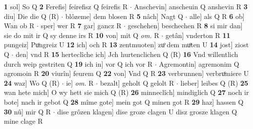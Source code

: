\documentclass[8pt,a4paper,notitlepage]{article}
\begin{document}
\begin{table}[ht]
\begin{minipage}[t]{0.5\linewidth}
\textbf{1} sol] So Q \textbf{2} Ferefis] feirefisz Q feirefis R  $\cdot$ Anschevin] anscheuin Q anshevin R \textbf{3} diu] Die die Q (R)  $\cdot$ blôzeme] dem blosen R \textbf{5} nâch] Nagt Q  $\cdot$ alle] als Q R \textbf{6} ob] Wan ob R  $\cdot$ sper] wer R \textbf{7} gar] gancz R  $\cdot$ geschehen] beschechen R \textbf{8} si mir dan] sie do mit ir Q sy denne irs R \textbf{10} von] mit Q \textit{om.} R  $\cdot$ getân] vnderton R \textbf{11} pungeiz] Puͦngreiz U \textbf{12} ich] och R \textbf{13} zentmuoten] zuͦ dem muͦten U \textbf{14} jost] ziost Q  $\cdot$ den] vnd R \textbf{15} herteclîche ich] Jch hurtenclichen Q (R) \textbf{16} Vnd willentlich durch weip gestriten Q \textbf{19} ich in] vor Q ich vor R  $\cdot$ Agremontin] agremonim Q agromoin R \textbf{20} viurîn] feurem Q \textbf{22} von] Vnd Q R \textbf{23} verbrunnen] verbruͦmiere U \textbf{24} waz] Wo Q (R)  $\cdot$ ie] \textit{om.} R  $\cdot$ bezalt] geholt Q gelolt R  $\cdot$ lieber] leibes Q (R) \textbf{25} wan hete mich] O wy hett sie mich Q (R) \textbf{26} minneclîch] mindiglich Q \textbf{27} noch ir bote] nach ir gebot Q \textbf{28} mîme gote] mein got Q minen got R \textbf{29} haz] hassen Q \textbf{30} nû] mir Q R  $\cdot$ dise grôzen klagen] dise groze clagen U disz grosze klagen Q mine clage R \newline
\end{minipage}
\end{table}
\end{document}
